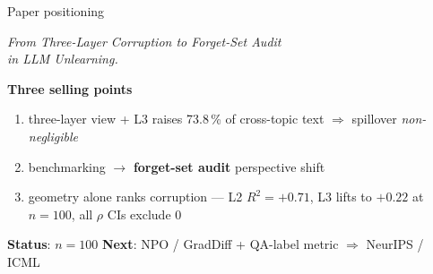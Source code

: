 \documentclass[aspectratio=169,10pt]{beamer}
\begin{document}
\begin{frame}{Paper positioning}
    \begin{center}
        \large
        \emph{From Three-Layer Corruption to Forget-Set Audit\\ in LLM Unlearning.}
    \end{center}

    \vspace{0.8em}
    \textbf{Three selling points}
    \begin{enumerate}
        \item three-layer view + L3 raises 73.8\,\% of cross-topic text $\Rightarrow$ spillover \emph{non-negligible}
        \item benchmarking $\to$ \textbf{forget-set audit} perspective shift
        \item geometry alone ranks corruption --- L2 $R^2=+0.71$, L3 lifts to $+0.22$ at $n=100$, all $\rho$ CIs exclude 0
    \end{enumerate}

    \vspace{0.6em}
    \begin{center}
        \small
        \textbf{Status}: $n{=}100$ \checkmark\quad \textbf{Next}: NPO / GradDiff \;+\; QA-label metric $\Rightarrow$ NeurIPS / ICML
    \end{center}
\end{frame}
\end{document}

